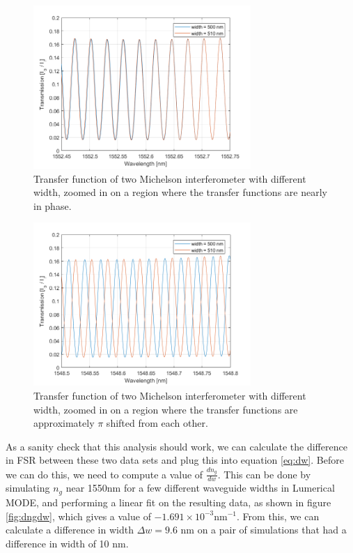 \documentclass[journal]{IEEEtran}
\begin{document}
\begin{figure}[t!]
  \centering
  \includegraphics[width = 3.25in]{fig/michaelson_in-phase.png}
  \caption{Transfer function of two Michelson interferometer with different width, zoomed in on a region where the transfer functions are nearly in phase.}
  \label{fig:mich-in}
\end{figure}

\begin{figure}[t!]
  \centering
  \includegraphics[width = 3.25in]{fig/michaelson_out-of-phase.png}
  \caption{Transfer function of two Michelson interferometer with different width, zoomed in on a region where the transfer functions are approximately $\pi$ shifted from each other.}
  \label{fig:mich-out}
\end{figure}

As a sanity check that this analysis should work, we can calculate the difference in FSR between these two data sets and plug this into equation \ref{eq:dw}. Before we can do this, we need to compute a value of $\frac{dn_g}{dw}$. This can be done by simulating $n_g$ near 1550nm for a few different waveguide widths in Lumerical MODE, and performing a linear fit on the resulting data, as shown in figure \ref{fig:dngdw}, which gives a value of $-1.691 \times 10^{-3} \text{nm}^{-1}$. From this, we can calculate a difference in width $\Delta w = 9.6$ nm on a pair of simulations that had a difference in width of 10 nm.
\end{document}
